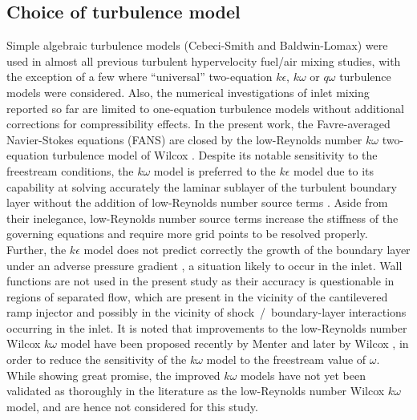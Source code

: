 \subsection{Choice of turbulence model}

Simple algebraic turbulence models (Cebeci-Smith and Baldwin-Lomax) were used
in almost all previous turbulent hypervelocity fuel/air mixing studies, with the
exception of a few \cite{aiaa:1998:lee,aiaaconf:1995:scherrer,jpp:1997:baurle}  where
``universal'' two-equation $k\epsilon$, $k\omega$ or $q\omega$ turbulence models were
considered. Also, the numerical investigations of inlet mixing reported so far
\cite{aiaa:1994:vasilev,jpp:2001:guoskov}
are limited to one-equation turbulence models without additional corrections
for compressibility effects.
In the present work, the Favre-averaged Navier-Stokes equations (FANS) are
closed by the low-Reynolds number $k\omega$ two-equation
turbulence model of Wilcox \cite{aiaa:1988:wilcox}. Despite its notable sensitivity
to the freestream conditions, the $k\omega$ model is preferred
to the $k\epsilon$ model due to its capability at solving
accurately the laminar sublayer of the turbulent boundary layer without the addition
of low-Reynolds number source terms \cite{aiaa:1988:wilcox}.
Aside from their inelegance, low-Reynolds
number source terms increase the stiffness of the governing equations and
require more grid points to be resolved properly. Further, the $k\epsilon$ model does
not predict correctly the growth of the boundary layer under an adverse pressure
gradient \cite{book:1994:wilcox}, a situation likely to occur in the inlet.
Wall functions are not used in the present study
as their accuracy is questionable in regions of
separated flow, which are present in the vicinity of the cantilevered ramp injector
and possibly in the vicinity of shock~/~boundary-layer interactions occurring
in the inlet. It is noted that improvements to the low-Reynolds number
Wilcox $k\omega$ model have been proposed recently by Menter \cite{nasa:1992:menter}
and later by Wilcox \cite{book:1998:wilcox}, in order to reduce the sensitivity of the $k\omega$
model to the freestream value of $\omega$. While showing great promise, the improved $k\omega$
models have not yet been validated as thoroughly in the literature as the low-Reynolds
number Wilcox $k\omega$ model, and are hence not considered for this study.

